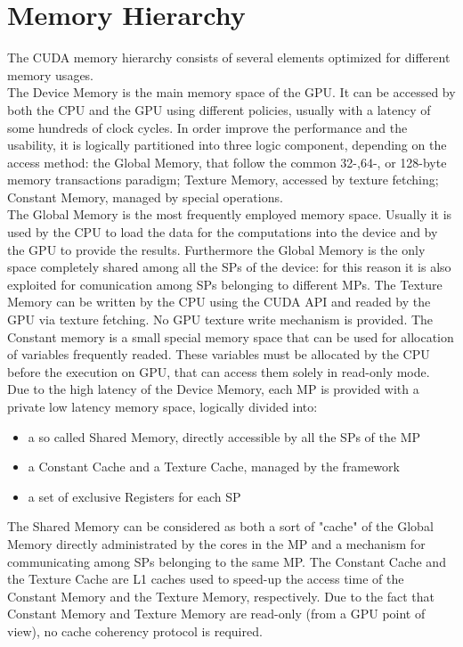 \section{Memory Hierarchy}
The CUDA memory hierarchy consists of several elements optimized for different memory usages.\\
The Device Memory is the main memory space of the GPU. It can be accessed by both the CPU and the GPU using different policies, usually with a latency of some hundreds of clock cycles. In order improve the performance and the usability, it is logically partitioned into three logic component, depending on the access method: the Global Memory, that follow the common 32-,64-, or 128-byte memory transactions paradigm; Texture Memory, accessed by texture fetching; Constant Memory, managed by special operations.\\
The Global Memory is the most frequently employed memory space. Usually it is used by the CPU to load the data for the computations into the device and by the GPU to provide the results. Furthermore the Global Memory is the only space completely shared among all the SPs of the device: for this reason it is also exploited for comunication among SPs belonging to different MPs. The Texture Memory can be written by the CPU using the CUDA API and readed by the GPU via texture fetching. No GPU texture write mechanism is provided. The Constant memory is a small special memory space that can be used for allocation of variables frequently readed. These variables must be allocated by the CPU before the execution on GPU, that can access them solely in read-only mode.\\ 
Due to the high latency of the Device Memory, each MP is provided with a private low latency memory space, logically divided into:
\begin{itemize}
\item a so called Shared Memory, directly accessible by all the SPs of the MP
\item a Constant Cache and a Texture Cache, managed by the framework
\item a set of exclusive Registers for each SP
\end{itemize}
The Shared Memory can be considered as both a sort of "cache" of the Global Memory 
 directly administrated by the cores in the MP and a mechanism for communicating among SPs belonging to the same MP. The Constant Cache and the Texture Cache are L1 caches used to speed-up the access time of the Constant Memory and the Texture Memory, respectively. Due to the fact that Constant Memory and Texture Memory are read-only (from a GPU point of view), no cache coherency protocol is required.\\ 


